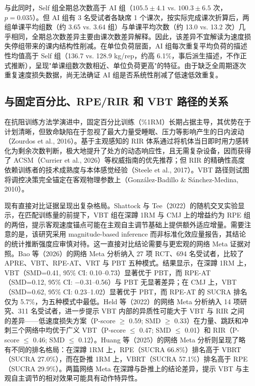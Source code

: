 \documentclass[UTF8,zihao=-4,twoside,openany]{ctexbook}
\begin{document}
与此同时，Self 组全期总次数高于 AI 组（$105.5 \pm 4.1$ vs. $100.3 \pm 6.5$ 次，$p=0.035$）。但 AI 组有 3 名受试者各缺席 1 个课次，按实际完成课次折算后，两组单课平均组数（约 3.65 vs. 3.64 组）与单课平均次数（约 13.0 vs. 13.2 次）几乎相同，全期总次数差异主要由课次数差异解释。因此，该差异不宜解读为速度损失停组带来的课内结构性削减。在单位负荷层面，AI 组每次重复平均负荷的描述性均值高于 Self 组（136.7 vs. 128.9 kg/rep，约高 6.1\%，事后派生描述，不作正式推断），呈现"单课组数次数相近、单位负荷更高"的特征。由于缺乏全周期逐次重复速度损失数据，尚无法确证 AI 组是否系统性削减了低速低效重复。

\subsection{与固定百分比、RPE/RIR 和 VBT 路径的关系}
在抗阻训练方法学演进中，固定百分比训练（\%1RM）长期占据主导，其优势在于计划清晰，但致命缺陷在于忽视了最大力量受睡眠、压力等影响产生的日内波动（Zourdos et al., 2016）。基于主观感知的 RIR 体系通过将机体当日即时用力感转化为剩余次数判断，极大地提升了处方的动态响应性，且无需复杂设备，因而获得了 ACSM（Currier et al., 2026）等权威指南的优先推荐；但 RIR 的精确性高度依赖训练者的技术成熟度与本体感觉经验（Steele et al., 2017）。VBT 路径则试图将调控决策完全锚定在客观物理参数上（González-Badillo \& Sánchez-Medina, 2010）。

现有直接对比证据呈现出复杂格局。Shattock 与 Tee（2022）的随机交叉实验显示，在匹配训练量的前提下，VBT 组在深蹲 1RM 与 CMJ 上的增益约为 RPE 组的两倍，提示客观速度锚点可能在主观自主调节基础上提供额外适应增量。需要注意的是，该研究采用 magnitude-based inference 而非标准化效应量报告，其结论的统计推断强度应审慎对待。这一直接对比结论需要与更宏观的网络 Meta 证据对照。Bao 等（2026）的网络 Meta 分析纳入 27 项 RCT、694 名受试者，比较了 APRE、VBT、RPE-AT、VRT 与 PBT 五种模式。结果显示，在深蹲 1RM 上，VBT（SMD=0.41, 95\% CI: 0.10--0.73）显著优于 PBT，而 RPE-AT（SMD=0.12, 95\% CI: $-$0.31--0.56）与 PBT 无显著差异；在 CMJ 上，VBT（SMD=0.62, 95\% CI: 0.23--1.02）显著优于 PBT，而 RPE-AT 的 SUCRA 排名仅为 5.7\%，为五种模式中最低。Held 等（2022）的网络 Meta 分析纳入 14 项研究、311 名受试者，进一步提示 VBT 内部的异质性可能大于 VBT 与 RIR 之间的差异——低速度损失方案（P-score $\ge$ 0.59; SMD $\ge$ 0.33）在力量、跳跃和冲刺三个网络中均优于广义 VBT（P-score $\le$ 0.47; SMD $\le$ 0.01）和 RIR（P-score $\le$ 0.46; SMD $\le$ 0.12）。Huang 等（2025）的网络 Meta 分析则呈现了略有不同的排名格局：在深蹲 1RM 上，RPE（SUCRA 66.8\%）排名高于 VBRT（SUCRA 27.0\%），而在卧推 1RM 上，VBRT（SUCRA 57.1\%）排名高于 RPE（SUCRA 29.9\%）。两篇网络 Meta 在深蹲与卧推上的结论差异，提示 VBT 与主观自主调节的相对效果可能具有动作特异性。
\end{document}
